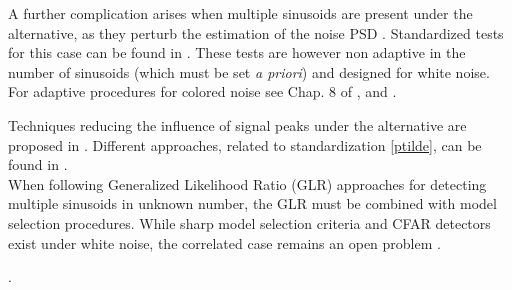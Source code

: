 \documentclass[journal]{IEEEtran}
\begin{document}
{  A further complication arises  when multiple sinusoids are present under the alternative, as they perturb the estimation of the noise PSD
\cite{Siegel_1980,Priestley_1981}. Standardized tests  for this case  can be found in   \cite{Shimshoni_1971, Siegel_1980,Bolviken_1983a, Bolviken_1983b, Chiu_1989,Li_2014}.  
These tests are however non adaptive in the  number of sinusoids (which must be set {\textit{a priori}}) and designed for white noise. 
  For adaptive procedures for colored noise
see  Chap. 8 of \cite{Priestley_1981}, and 
\cite{Sachs_1993,Sachs_1994,Bhansali_1979,Truong_1990,Quinn_1991,Quinn_1999,Kavalieris_1994,Hannan_1961,Nicholls_1967}.
 
Techniques reducing the influence of signal peaks under the alternative are proposed in  \cite{Chiu_1990,Gryca_1998}. 
Different approaches,  related to standardization \eqref{ptilde}, can be found in  \cite{White_1999,Lu_2005,Liavas_1998,Zheng_2012}.
\\ When following Generalized Likelihood Ratio (GLR) approaches { for detecting  multiple sinusoids in unknown number,  the GLR  must} be combined with model selection procedures. While  sharp model selection criteria and CFAR detectors exist under white noise, the correlated case remains an open problem \cite{Nadler_2011}.}
  
  {  \cite{Koen_2015a,Koen_2015b,Hatzes_2013,Tuomi_2012}}.  
 
  
  
   
   
\end{document}
